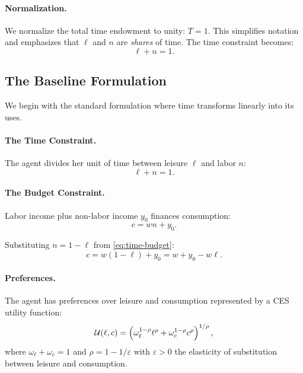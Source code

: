 \paragraph{Normalization.}
We normalize the total time endowment to unity: $T = 1$. This simplifies notation and emphasizes that $\ell$ and $n$ are \emph{shares} of time. The time constraint becomes:
\begin{equation}
\ell + n = 1.
\label{eq:time-constraint-linear}
\end{equation}

\subsection{The Baseline Formulation}
\label{subsec:labor-baseline}

We begin with the standard formulation where time transforms linearly into its uses.

\paragraph{The Time Constraint.}
The agent divides her unit of time between leisure $\ell$ and labor $n$:
\begin{equation}
\ell + n = 1.
\label{eq:time-budget}
\end{equation}

\paragraph{The Budget Constraint.}
Labor income plus non-labor income $y_0$ finances consumption:
\begin{equation}
c = wn + y_0.
\label{eq:consumption-budget}
\end{equation}

Substituting $n = 1 - \ell$ from \eqref{eq:time-budget}:
\begin{equation}
c = w(1 - \ell) + y_0 = w + y_0 - w\ell.
\label{eq:consumption-leisure}
\end{equation}

\paragraph{Preferences.}
The agent has preferences over leisure and consumption represented by a CES utility function:
\begin{equation}
\mathcal{U}(\ell, c) = \left( \omega_\ell^{1-\rho} \ell^\rho + \omega_c^{1-\rho} c^\rho \right)^{1/\rho},
\label{eq:utility-labor}
\end{equation}
where $\omega_\ell + \omega_c = 1$ and $\rho = 1 - 1/\varepsilon$ with $\varepsilon > 0$ the elasticity of substitution between leisure and consumption.

